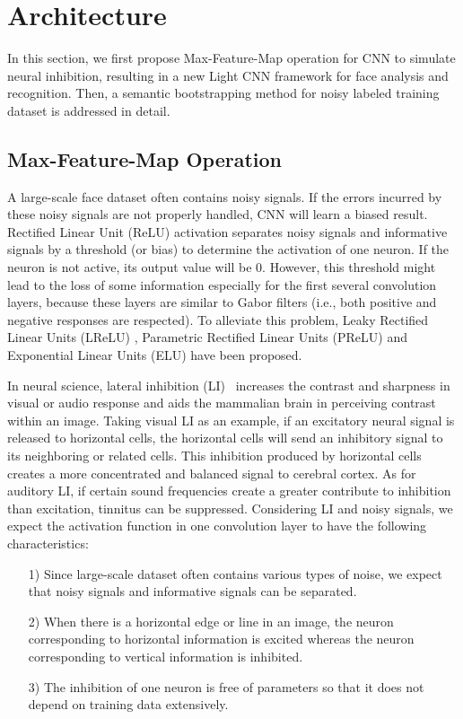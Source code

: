 \documentclass[journal,transmag]{IEEEtran}
\begin{document}
\section{Architecture}

In this section, we first propose Max-Feature-Map operation for CNN to simulate neural inhibition, resulting in a new Light CNN framework for face analysis and recognition. Then, a semantic bootstrapping method for noisy labeled training dataset is addressed in detail.

\subsection{Max-Feature-Map Operation}
A large-scale face dataset often contains noisy signals. If the errors incurred by these noisy signals are not properly handled, CNN will learn a biased result. Rectified Linear Unit (ReLU) \cite{nair2010rectified} activation separates noisy signals and informative signals by a threshold (or bias) to determine the activation of one neuron. If the neuron is not active, its output value will be 0. However, this threshold might lead to the loss of some information especially for the first several convolution layers, because these layers are similar to Gabor filters (i.e., both positive and negative responses are respected). To alleviate this problem, Leaky Rectified Linear Units (LReLU) \cite{maas2013rectifier}, Parametric Rectified Linear Units (PReLU) \cite{DBLP:conf/iccv/HeZRS15} and Exponential Linear Units (ELU) \cite{DBLP:journals/corr/ClevertUH15} have been proposed.

In neural science, lateral inhibition (LI)~\cite{Amari1977DynamicsOP} increases the contrast and sharpness in visual or audio response and aids the mammalian brain in perceiving contrast within an image. Taking visual LI as an example, if an excitatory neural signal is released to horizontal cells, the horizontal cells will send an inhibitory signal to its neighboring or related cells. This inhibition produced by horizontal cells creates a more concentrated and balanced signal to cerebral cortex. As for auditory LI, if certain sound frequencies create a greater contribute to inhibition than excitation, tinnitus can be suppressed. Considering LI and noisy signals, we expect the activation function in one convolution layer to have the following characteristics:
\begin{itemize}\setlength{\itemsep}{1pt}
\item[1)] Since large-scale dataset often contains various types of noise, we expect that noisy signals and informative signals can be separated.
\item[2)] When there is a horizontal edge or line in an image, the neuron corresponding to horizontal information is excited whereas the neuron corresponding to vertical information is inhibited.
\item[3)] The inhibition of one neuron is free of parameters so that it does not depend on training data extensively.
\end{itemize}
\end{document}
